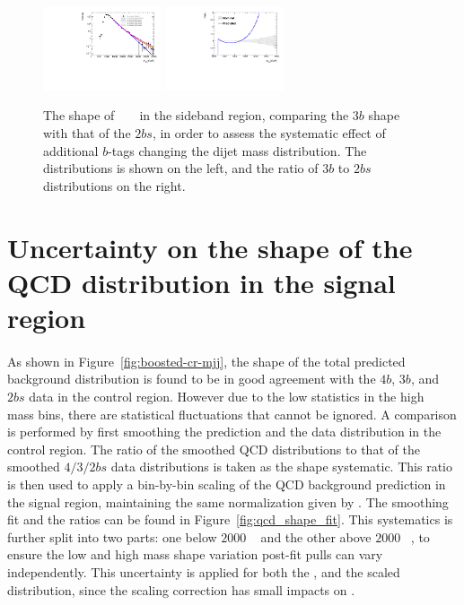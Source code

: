 \begin{figure}[htb!]
\begin{center} 
\includegraphics[width=0.31\textwidth,angle=-90]{figures/boosted/Syst_Smooth/TopShapeSRSysfitSmooth_sig33_comp22.pdf}
\includegraphics[width=0.31\textwidth,angle=-90]{figures/boosted/Syst_Smooth/TopShapeSRSysfitSmooth_sig33_comp22_ratio.pdf}
\caption{The shape of \ttbar~ \mtwoJ~ in the sideband region,
comparing the $3b$ shape with that of the $2bs$, in order to assess the systematic effect of additional $b$-tags changing the dijet mass distribution.  The \mtwoJ~ distributions is shown on the left, and the ratio of $3b$ to $2bs$ distributions on the right.}
\label{fig:ttbar-shapes-signal}
\end{center}
\end{figure}


\section{Uncertainty on the shape of the QCD distribution in the signal region}
\label{unc-shape-qcd-in-sr}

\paragraph{}
As shown in Figure~\ref{fig:boosted-cr-mjj}, the shape of the total predicted background distribution is found to be in good agreement with the $4b$, $3b$, and $2bs$ data in the control region. 
However due to the low statistics in the high \mtwoJ~ mass bins, there are statistical fluctuations that cannot be ignored. 
A comparison is performed by first smoothing the prediction and the data distribution in the control region. 
The ratio of the smoothed QCD distributions to that of the smoothed $4/3/2bs$ data distributions is taken as the shape systematic. 
This ratio is then used to apply a bin-by-bin scaling of the QCD background prediction in the signal region, maintaining the same normalization given by \muqcd.  
The smoothing fit and the ratios can be found in Figure~\ref{fig:qcd_shape_fit}. 
This systematics is further split into two parts: one below $2000$ \GeV~ and the other above $2000$ \GeV~, to ensure the low and high mass shape variation post-fit pulls can vary independently.
This uncertainty is applied for both the \mtwoJ, and the scaled \mtwoJ~ distribution, since the scaling correction has small impacts on \mtwoJ. 

